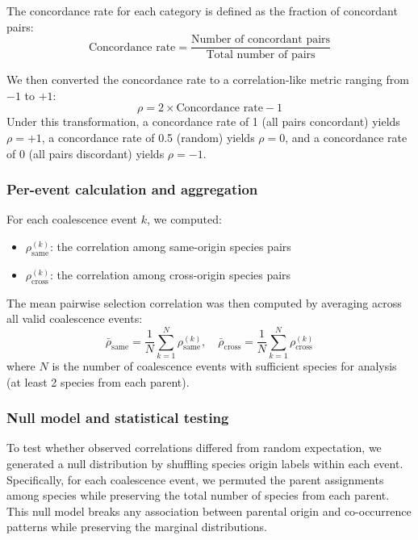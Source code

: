 The concordance rate for each category is defined as the fraction of concordant pairs:
\begin{equation}
\text{Concordance rate} = \frac{\text{Number of concordant pairs}}{\text{Total number of pairs}}
\end{equation}

We then converted the concordance rate to a correlation-like metric ranging from $-1$ to $+1$:
\begin{equation}
\rho = 2 \times \text{Concordance rate} - 1
\label{eq:concordance_to_correlation}
\end{equation}
Under this transformation, a concordance rate of 1 (all pairs concordant) yields $\rho = +1$, a concordance rate of 0.5 (random) yields $\rho = 0$, and a concordance rate of 0 (all pairs discordant) yields $\rho = -1$.

\subsubsection*{Per-event calculation and aggregation}

For each coalescence event $k$, we computed:
\begin{itemize}
    \item $\rho_{\text{same}}^{(k)}$: the correlation among same-origin species pairs
    \item $\rho_{\text{cross}}^{(k)}$: the correlation among cross-origin species pairs
\end{itemize}

The mean pairwise selection correlation was then computed by averaging across all valid coalescence events:
\begin{equation}
\bar{\rho}_{\text{same}} = \frac{1}{N}\sum_{k=1}^{N} \rho_{\text{same}}^{(k)}, \quad
\bar{\rho}_{\text{cross}} = \frac{1}{N}\sum_{k=1}^{N} \rho_{\text{cross}}^{(k)}
\end{equation}
where $N$ is the number of coalescence events with sufficient species for analysis (at least 2 species from each parent).

\subsubsection*{Null model and statistical testing}

To test whether observed correlations differed from random expectation, we generated a null distribution by shuffling species origin labels within each event. Specifically, for each coalescence event, we permuted the parent assignments among species while preserving the total number of species from each parent. This null model breaks any association between parental origin and co-occurrence patterns while preserving the marginal distributions.

